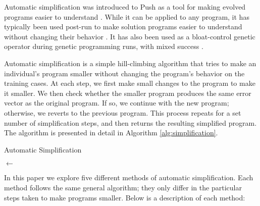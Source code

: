 Automatic simplification was introduced to Push as a tool for making evolved programs easier to understand \cite{Robinson:2001:GPtieus, spector:2002:GPEM}. While it can be applied to any program, it has typically been used post-run to make solution programs easier to understand without changing their behavior \cite{Spector:2014:GECCOcomp}. It has also been used as a bloat-control genetic operator during genetic programming runs, with mixed success \cite{Zhan:2014:GECCOcomp}. 

Automatic simplification is a simple hill-climbing algorithm that tries to make an individual's program smaller without changing the program's behavior on the training cases. At each step, we first make small changes to the program to make it smaller. We then check whether the smaller program produces the same error vector as the original program. If so, we continue with the new program; otherwise, we reverts to the previous program. This process repeats for a set number of simplification steps, and then returns the resulting simplified program. The algorithm is presented in detail in Algorithm \ref{alg:simplification}.

\begin{algorithm}[ht]
\caption{Automatic Simplification}
\label{alg:simplification}


\BlankLine

\ErrorVector $\leftarrow$ \ComputeErrors{\Ind} \;
\Return \Ind
\end{algorithm}

In this paper we explore five different methods of automatic simplification. Each method follows the same general algorithm; they only differ in the particular steps taken to make programs smaller. %
Below is a description of each method:

